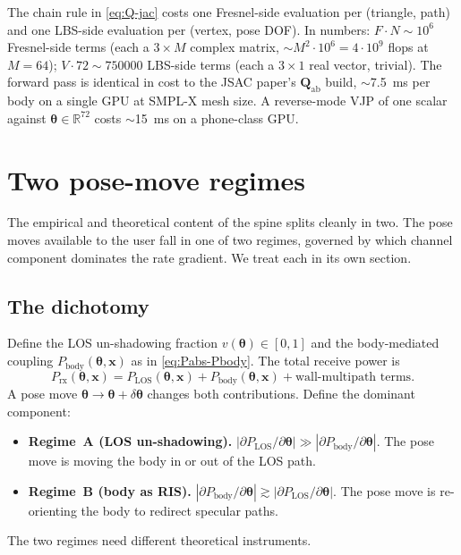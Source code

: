 \documentclass[11pt,a4paper]{article}
\theoremstyle{definition}
\newcommand{\Reals}{\mathbb{R}}
\newcommand{\Qabs}{\mathbf{Q}_{\mathrm{ab}}}
\newcommand{\xvec}{\mathbf{x}}
\newcommand{\thetab}{\bm{\theta}}
\newcommand{\Pbody}{P_{\mathrm{body}}}
\begin{document}
The chain rule in \eqref{eq:Q-jac} costs one Fresnel-side
evaluation per (triangle, path) and one LBS-side evaluation per
(vertex, pose DOF).  In numbers: $F\cdot N\sim 10^6$ Fresnel-side
terms (each a $3\times M$ complex matrix, $\sim M^2\cdot 10^6=
4\cdot 10^9$ flops at $M=64$); $V\cdot 72\sim\num{750000}$
LBS-side terms (each a $3\times 1$ real vector, trivial).  The
forward pass is identical in cost to the JSAC paper's $\Qabs$
build, $\sim$\SI{7.5}{ms} per body on a single GPU at SMPL-X mesh
size.  A reverse-mode VJP of one scalar against $\thetab\in
\Reals^{72}$ costs $\sim$\SI{15}{ms} on a phone-class GPU.

\section{Two pose-move regimes}\label{sec:regimes}

The empirical and theoretical content of the spine splits cleanly
in two.  The pose moves available to the user fall in one of two
regimes, governed by which channel component dominates the rate
gradient.  We treat each in its own section.

\subsection{The dichotomy}

Define the LOS un-shadowing fraction
$v(\thetab)\in[0,1]$ and the body-mediated coupling
$\Pbody(\thetab,\xvec)$ as in \eqref{eq:Pabs-Pbody}.  The total
receive power is
\begin{equation}\label{eq:Prx}
  P_{\mathrm{rx}}(\thetab,\xvec)
  =P_{\mathrm{LOS}}(\thetab,\xvec)+\Pbody(\thetab,\xvec)
  +\text{wall-multipath terms}.
\end{equation}
A pose move $\thetab\to\thetab+\delta\thetab$ changes both
contributions.  Define the dominant component:
\begin{itemize}[leftmargin=1.6em,itemsep=2pt]
\item \textbf{Regime~A (LOS un-shadowing).}  $|\partial
P_{\mathrm{LOS}}/\partial\thetab|\gg|\partial\Pbody/\partial
\thetab|$.  The pose move is moving the body in or out of the LOS
path.
\item \textbf{Regime~B (body as RIS).}  $|\partial\Pbody/\partial
\thetab|\gtrsim|\partial P_{\mathrm{LOS}}/\partial\thetab|$.  The
pose move is re-orienting the body to redirect specular paths.
\end{itemize}
The two regimes need different theoretical instruments.
\end{document}
